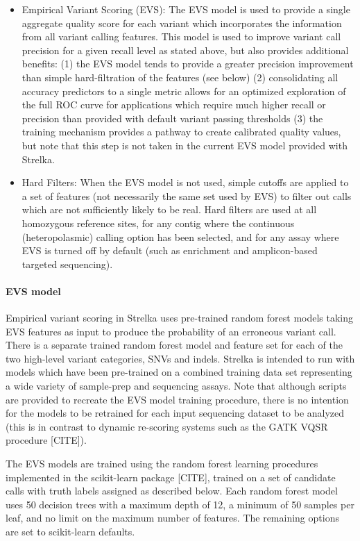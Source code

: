 \documentclass{article}
\begin{document}
\begin{itemize}
    \item Empirical Variant Scoring (EVS):
    The EVS model is used to provide a single aggregate quality score for each variant which incorporates the information from all variant calling features. This model is used to improve variant call precision for a given recall level as stated above, but also provides additional benefits: (1) the EVS model tends to provide a greater precision improvement than simple hard-filtration of the features (see below) (2) consolidating all accuracy predictors to a single metric allows for an optimized exploration of the full ROC curve for applications which require much higher recall or precision than provided with default variant passing thresholds (3) the training mechanism provides a pathway to create calibrated quality values, but note that this step is not taken in the current EVS model provided with Strelka.
    \item Hard Filters:
    When the EVS model is not used, simple cutoffs are applied to a set of features (not necessarily the same set used by EVS) to filter out calls which are not sufficiently likely to be real. Hard filters are used at all homozygous reference sites, for any contig where the continuous (heteropolasmic) calling option has been selected, and for any assay where EVS is turned off by default (such as enrichment and amplicon-based targeted sequencing).
\end{itemize}


\paragraph{EVS model}

Empirical variant scoring in Strelka uses pre-trained random forest models taking EVS features as input to produce the probability of an erroneous variant call. There is a separate trained random forest model and feature set for each of the two high-level variant categories, SNVs and indels. Strelka is intended to run with models which have been pre-trained on a combined training data set representing a wide variety of sample-prep and sequencing assays. Note that although scripts are provided to recreate the EVS model training procedure, there is no intention for the models to be retrained for each input sequencing dataset to be analyzed (this is in contrast to dynamic re-scoring systems such as the GATK VQSR procedure [CITE]).

The EVS models are trained using the random forest learning procedures implemented in the scikit-learn package [CITE], trained on a set of candidate calls with truth labels assigned as described below. Each random forest model uses 50 decision trees with a maximum depth of 12, a minimum of 50 samples per leaf, and no limit on the maximum number of features. The remaining options are set to scikit-learn defaults.
\end{document}
